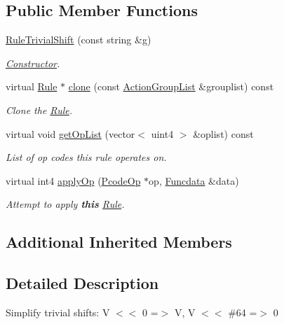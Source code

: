 \subsection*{Public Member Functions}
\begin{DoxyCompactItemize}
\item 
\mbox{\hyperlink{class_rule_trivial_shift_aaf74674402f18f94fcd7ce4675271ed5}{Rule\+Trivial\+Shift}} (const string \&g)
\begin{DoxyCompactList}\small\item\em \mbox{\hyperlink{class_constructor}{Constructor}}. \end{DoxyCompactList}\item 
virtual \mbox{\hyperlink{class_rule}{Rule}} $\ast$ \mbox{\hyperlink{class_rule_trivial_shift_a9a7e9aacdba678db987601eb1c633662}{clone}} (const \mbox{\hyperlink{class_action_group_list}{Action\+Group\+List}} \&grouplist) const
\begin{DoxyCompactList}\small\item\em Clone the \mbox{\hyperlink{class_rule}{Rule}}. \end{DoxyCompactList}\item 
virtual void \mbox{\hyperlink{class_rule_trivial_shift_a0d7693f3e4139a4a712a592c2ab9f684}{get\+Op\+List}} (vector$<$ uint4 $>$ \&oplist) const
\begin{DoxyCompactList}\small\item\em List of op codes this rule operates on. \end{DoxyCompactList}\item 
virtual int4 \mbox{\hyperlink{class_rule_trivial_shift_a373f11af57c1291eac63c4b69afde34a}{apply\+Op}} (\mbox{\hyperlink{class_pcode_op}{Pcode\+Op}} $\ast$op, \mbox{\hyperlink{class_funcdata}{Funcdata}} \&data)
\begin{DoxyCompactList}\small\item\em Attempt to apply {\bfseries{this}} \mbox{\hyperlink{class_rule}{Rule}}. \end{DoxyCompactList}\end{DoxyCompactItemize}
\subsection*{Additional Inherited Members}


\subsection{Detailed Description}
Simplify trivial shifts\+: {\ttfamily V $<$$<$ 0 =$>$ V, V $<$$<$ \#64 =$>$ 0} 

